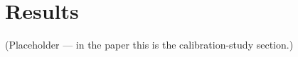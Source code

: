 \documentclass[11pt]{article}
\begin{document}


\section{Results}\label{sec:results}
(Placeholder --- in the paper this is the calibration-study section.)



\end{document}
